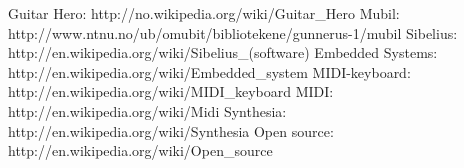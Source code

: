 \begin{thebibliography}{9}

Guitar Hero: 
http://no.wikipedia.org/wiki/Guitar\_Hero
Mubil: 
http://www.ntnu.no/ub/omubit/bibliotekene/gunnerus-1/mubil
Sibelius: 
http://en.wikipedia.org/wiki/Sibelius\_(software)
Embedded Systems: 
http://en.wikipedia.org/wiki/Embedded\_system
MIDI-keyboard:
http://en.wikipedia.org/wiki/MIDI\_keyboard
MIDI:
http://en.wikipedia.org/wiki/Midi
Synthesia:
http://en.wikipedia.org/wiki/Synthesia
Open source:
http://en.wikipedia.org/wiki/Open\_source

\end{thebibliography}
